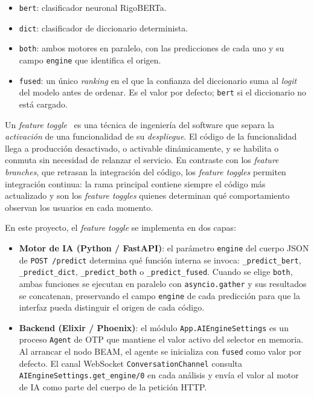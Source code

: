 \begin{itemize}
 \item \texttt{\textquotedbl{}bert\textquotedbl{}}: clasificador neuronal RigoBERTa.
 \item \texttt{\textquotedbl{}dict\textquotedbl{}}: clasificador de diccionario determinista.
 \item \texttt{\textquotedbl{}both\textquotedbl{}}: ambos motores en paralelo, con las predicciones de cada uno y su campo \texttt{\textquotedbl{}engine\textquotedbl{}} que identifica el origen.
 \item \texttt{\textquotedbl{}fused\textquotedbl{}}: un único \emph{ranking} en el que la confianza del diccionario suma al \emph{logit} del modelo antes de ordenar. Es el valor por defecto; \texttt{\textquotedbl{}bert\textquotedbl{}} si el diccionario no está cargado.
\end{itemize}

Un \emph{feature toggle}~\cite{Fowler17} es una técnica de ingeniería del software que separa la \emph{activación} de una funcionalidad de su \emph{despliegue}. El código de la funcionalidad llega a producción desactivado, o activable dinámicamente, y se habilita o conmuta sin necesidad de relanzar el servicio. En contraste con los \emph{feature branches}, que retrasan la integración del código, los \emph{feature toggles} permiten integración continua: la rama principal contiene siempre el código más actualizado y son los \emph{feature toggles} quienes determinan qué comportamiento observan los usuarios en cada momento.

En este proyecto, el \emph{feature toggle} se implementa en dos capas:

\begin{itemize}
 \item \textbf{Motor de IA (Python / FastAPI)}: el parámetro \texttt{engine} del cuerpo JSON de \texttt{POST /predict} determina qué función interna se invoca: \texttt{\_predict\_bert}, \texttt{\_predict\_dict}, \texttt{\_predict\_both} o \texttt{\_predict\_fused}. Cuando se elige \texttt{\textquotedbl{}both\textquotedbl{}}, ambas funciones se ejecutan en paralelo con \texttt{asyncio.gather} y sus resultados se concatenan, preservando el campo \texttt{\textquotedbl{}engine\textquotedbl{}} de cada predicción para que la interfaz pueda distinguir el origen de cada código.

 \item \textbf{Backend (Elixir / Phoenix)}: el módulo \texttt{App.AIEngineSettings} es un proceso \texttt{Agent} de OTP que mantiene el valor activo del selector en memoria. Al arrancar el nodo BEAM, el agente se inicializa con \texttt{\textquotedbl{}fused\textquotedbl{}} como valor por defecto. El canal WebSocket \texttt{ConversationChannel} consulta \texttt{AIEngineSettings.get\_engine/0} en cada análisis y envía el valor al motor de IA como parte del cuerpo de la petición HTTP.
\end{itemize}

